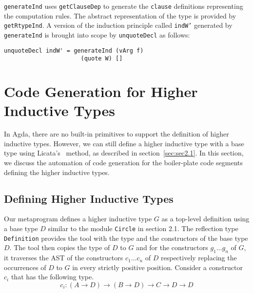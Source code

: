 \documentclass[sigplan,10pt]{acmart}
\begin{document}

{\tt generateInd} uses {\tt getClauseDep} to generate the {\tt clause} definitions representing the computation rules. The abstract representation of the type is provided by {\tt getRtypeInd}.
A version of the induction principle called {\tt indW'} generated by {\tt generateInd} is brought into scope by {\tt unquoteDecl} as follows:
\begin{center}
\begingroup
\begin{BVerbatim}
unquoteDecl indW' = generateInd (vArg f) 
                      (quote W) []
\end{BVerbatim}
\endgroup
\end{center}

%
\section{Code Generation for Higher Inductive Types}
\label{sec:sec4}

In Agda, there are no built-in primitives to support the definition of higher inductive types.
However, we can still define a higher inductive type with a base type using Licata's~\citep{Licata-2011} method, as described in section~\ref{sec:sec2.1}.
In this section, we discuss the automation of code generation for the boiler-plate code segments defining the higher inductive types.


\subsection{Defining Higher Inductive Types}
\label{sec:sec4.1}

Our metaprogram defines a higher inductive type $G$ as a top-level definition using a base type $D$ similar to the module {\tt Circle} in section 2.1. The reflection type {\tt Definition} provides the tool with the type and the constructors of the base type $D$. The tool then copies the type of $D$ to $G$ and for the constructors $g_1 \ldots g_n$ of $G$, it traverses the AST of the constructors $c_1 \ldots c_n$ of $D$ respectively replacing the occurrences of $D$ to $G$ in every strictly positive position. Consider a constructor $c_i$ that has the following type.
\begin{equation*}
c_i : (A \rightarrow D) \rightarrow (B \rightarrow D) \rightarrow C \rightarrow D \rightarrow D
\end{equation*}
\end{document}
